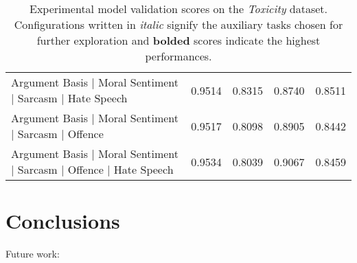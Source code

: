 \begin{table}[]
\begin{tabular}{l|cccc}
    Argument Basis | Moral Sentiment | Sarcasm | Hate Speech           & 0.9514          & 0.8315          & 0.8740          & 0.8511          \\
    Argument Basis | Moral Sentiment | Sarcasm | Offence               & 0.9517          & 0.8098          & 0.8905          & 0.8442          \\
    Argument Basis | Moral Sentiment | Sarcasm | Offence | Hate Speech & 0.9534          & 0.8039          & 0.9067          & 0.8459
  \end{tabular}
  \caption{Experimental model validation scores on the \textit{Toxicity} dataset. Configurations written in \textit{italic} signify the auxiliary tasks chosen for further exploration and \textbf{bolded} scores indicate the highest performances.}
  \label{tab:mtl_dev_wulczyn}
\end{table}




\section{Conclusions}

Future work:



